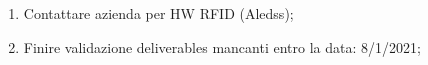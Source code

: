 \begin{enumerate}
    \item Contattare azienda per HW RFID (Aledss);
    \item Finire validazione deliverables mancanti entro la data: 8/1/2021;
\end{enumerate}